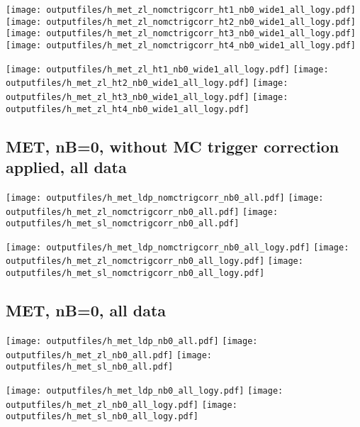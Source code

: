 \documentclass[11pt]{article}
\begin{document}
    \noindent
     \texttt{[image: outputfiles/h\_met\_zl\_nomctrigcorr\_ht1\_nb0\_wide1\_all\_logy.pdf]}
     \texttt{[image: outputfiles/h\_met\_zl\_nomctrigcorr\_ht2\_nb0\_wide1\_all\_logy.pdf]}
     \texttt{[image: outputfiles/h\_met\_zl\_nomctrigcorr\_ht3\_nb0\_wide1\_all\_logy.pdf]}
     \texttt{[image: outputfiles/h\_met\_zl\_nomctrigcorr\_ht4\_nb0\_wide1\_all\_logy.pdf]}


    \noindent
     \texttt{[image: outputfiles/h\_met\_zl\_ht1\_nb0\_wide1\_all\_logy.pdf]}
     \texttt{[image: outputfiles/h\_met\_zl\_ht2\_nb0\_wide1\_all\_logy.pdf]}
     \texttt{[image: outputfiles/h\_met\_zl\_ht3\_nb0\_wide1\_all\_logy.pdf]}
     \texttt{[image: outputfiles/h\_met\_zl\_ht4\_nb0\_wide1\_all\_logy.pdf]}


   \clearpage
    \subsection{ MET, nB=0, without MC trigger correction applied, all data}

    \noindent
    \texttt{[image: outputfiles/h\_met\_ldp\_nomctrigcorr\_nb0\_all.pdf]}
    \texttt{[image: outputfiles/h\_met\_zl\_nomctrigcorr\_nb0\_all.pdf]}
    \texttt{[image: outputfiles/h\_met\_sl\_nomctrigcorr\_nb0\_all.pdf]}

    \noindent
    \texttt{[image: outputfiles/h\_met\_ldp\_nomctrigcorr\_nb0\_all\_logy.pdf]}
    \texttt{[image: outputfiles/h\_met\_zl\_nomctrigcorr\_nb0\_all\_logy.pdf]}
    \texttt{[image: outputfiles/h\_met\_sl\_nomctrigcorr\_nb0\_all\_logy.pdf]}


    \subsection{ MET, nB=0, all data}

    \noindent
    \texttt{[image: outputfiles/h\_met\_ldp\_nb0\_all.pdf]}
    \texttt{[image: outputfiles/h\_met\_zl\_nb0\_all.pdf]}
    \texttt{[image: outputfiles/h\_met\_sl\_nb0\_all.pdf]}

    \noindent
    \texttt{[image: outputfiles/h\_met\_ldp\_nb0\_all\_logy.pdf]}
    \texttt{[image: outputfiles/h\_met\_zl\_nb0\_all\_logy.pdf]}
    \texttt{[image: outputfiles/h\_met\_sl\_nb0\_all\_logy.pdf]}
\end{document}
